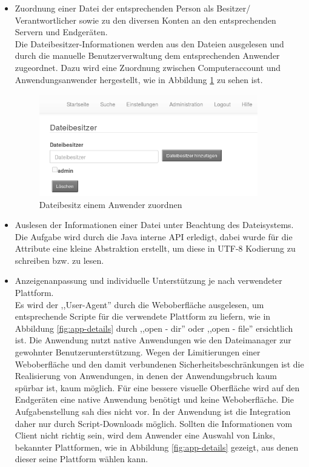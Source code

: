 \documentclass[oneside, ngerman, toc=bibliography,bibliography=totoc,listof=entryprefix, open=right,numbers=noenddot,fontsize=12pt]{scrbook}
\begin{document}
\begin{itemize}
     \item Zuordnung einer Datei der entsprechenden Person als Besitzer/ Verantwortlicher sowie zu den diversen Konten an den entsprechenden Servern und Endgeräten. \\
    Die Dateibesitzer-Informationen werden aus den Dateien ausgelesen und durch die manuelle Benutzerverwaltung dem entsprechenden Anwender zugeordnet. Dazu wird eine Zuordnung zwischen Computeraccount und Anwendungsanwender hergestellt, wie in  Abbildung \ref{fig:app-cfg-datei} zu sehen ist.
    \begin{figure}[htbp] 
        \centering
        \includegraphics[width=0.9\textwidth]{Masterarbeit_Bilder/einstellungen_dateibesitzer.png}
        \caption{Dateibesitz einem Anwender zuordnen}
        \label{fig:app-cfg-datei}
    \end{figure}  
    
    
    \item Auslesen der Informationen einer Datei unter Beachtung des Dateisystems.\\
    Die Aufgabe wird durch die Java interne API erledigt, dabei wurde für die Attribute eine kleine Abstraktion erstellt, um diese in UTF-8 Kodierung zu schreiben bzw. zu lesen. 
    
       
    \item Anzeigenanpassung und individuelle Unterstützung je nach verwendeter Plattform.\\
    Es wird  der ,,User-Agent'' durch die Weboberfläche ausgelesen, um entsprechende Scripte für die verwendete Plattform zu liefern, wie in Abbildung \ref{fig:app-details} durch ,,open - dir'' oder ,,open - file'' ersichtlich ist.
    Die Anwendung nutzt native Anwendungen wie den Dateimanager zur gewohnter Benutzerunterstützung. Wegen der Limitierungen einer Weboberfläche und den damit verbundenen Sicherheitsbeschränkungen ist die Realisierung von Anwendungen, in denen der Anwendungsbruch kaum spürbar ist, kaum möglich. Für eine bessere visuelle Oberfläche wird auf den Endgeräten eine native Anwendung benötigt und keine Weboberfläche. Die Aufgabenstellung sah dies nicht vor. In der Anwendung ist die Integration daher nur durch Script-Downloads möglich. 
    Sollten die Informationen vom Client nicht richtig sein, wird dem Anwender eine Auswahl von Links, bekannter Plattformen, wie in Abbildung \ref{fig:app-details} gezeigt, aus denen dieser seine Plattform wählen kann.
    

\end{itemize}
\end{document}
